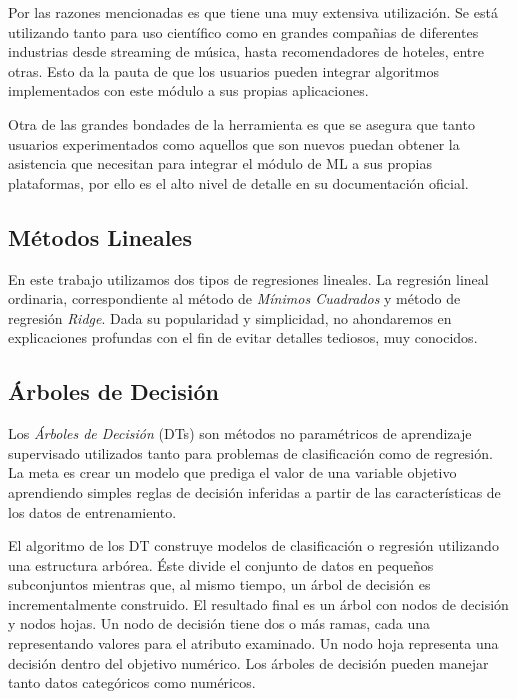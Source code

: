     \par Por las razones mencionadas es que tiene una muy extensiva utilización.
      Se está utilizando tanto para uso científico como en
      grandes compañias de diferentes industrias desde streaming de música, hasta
      recomendadores de hoteles, entre otras. Esto da la pauta de que los usuarios pueden
      integrar algoritmos implementados con este módulo a sus propias aplicaciones.

    \par Otra de las grandes bondades de la herramienta es que se asegura que
      tanto usuarios experimentados como aquellos que son nuevos puedan obtener
      la asistencia que necesitan para integrar el módulo de ML a sus propias
      plataformas, por ello es el alto nivel de detalle en su documentación oficial.



  \subsection{Métodos Lineales}

    \par En este trabajo utilizamos dos tipos de regresiones lineales. La regresión
    lineal ordinaria, correspondiente al método de \textit{Mínimos Cuadrados}\cite{least_square}
    y método de regresión \textit{Ridge}\cite{ridge}.
    Dada su popularidad y simplicidad, no ahondaremos en explicaciones profundas
    con el fin de evitar detalles tediosos, muy conocidos.


  \subsection{Árboles de Decisión}
    \par Los \textit{Árboles de Decisión} (DTs)\cite{decision_tree_regression}
      son métodos no paramétricos de aprendizaje supervisado
      utilizados tanto para problemas de clasificación como de regresión.
      La meta es crear un modelo que prediga el valor de una variable objetivo aprendiendo
      simples reglas de decisión inferidas a partir de las características de los datos
      de entrenamiento.


    \par El algoritmo de los DT construye modelos de clasificación o regresión
      utilizando una estructura arbórea. Éste divide el conjunto de datos en pequeños
      subconjuntos mientras que, al mismo tiempo, un árbol de decisión es incrementalmente
      construido. El resultado final es un árbol con nodos de decisión y nodos hojas.
      Un nodo de decisión tiene dos o más ramas, cada una representando valores para
      el atributo examinado. Un nodo hoja representa una decisión dentro del
      objetivo numérico. Los árboles de decisión pueden manejar tanto datos
      categóricos como numéricos.


